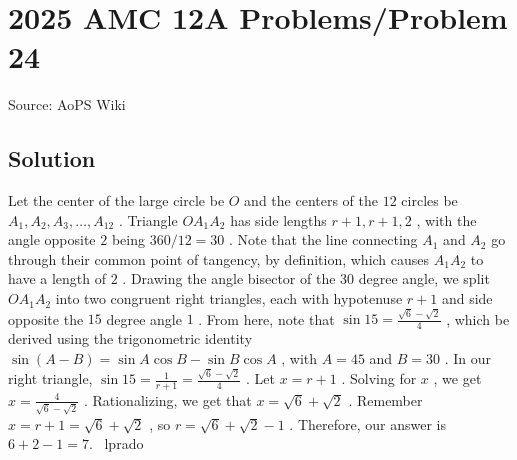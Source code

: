 \documentclass[12pt]{article}
\begin{document}
\section*{{2025 AMC 12A Problems/Problem 24}}
Source: AoPS Wiki

\subsection*{Solution}
Let the center of the large circle be $O$ and the centers of the $12$ circles be $A_1, A_2, A_3, \dots, A_{12}$ . Triangle $OA_1A_2$ has side lengths $r+1, r+1, 2$ , with the angle opposite $2$ being $360/12 = 30$ . Note that the line connecting $A_1$ and $A_2$ go through their common point of tangency, by definition, which causes $A_1A_2$ to have a length of $2$ . Drawing the angle bisector of the $30$ degree angle, we split $OA_1A_2$ into two congruent right triangles, each with hypotenuse $r+1$ and side opposite the $15$ degree angle $1$ . From here, note that $\sin{15} = \frac{\sqrt{6}-\sqrt{2}}{4}$ , which be derived using the trigonometric identity $\sin{(A-B)} = \sin{A} \cos{B} - \sin{B} \cos{A}$ , with $A=45$ and $B=30$ . In our right triangle, $\sin{15} = \frac{1}{r+1} = \frac{\sqrt{6}-\sqrt{2}}{4}$ . Let $x=r+1$ . Solving for $x$ , we get $x = \frac{4}{\sqrt{6}-\sqrt{2}}$ . Rationalizing, we get that $x = \sqrt{6}+\sqrt{2}$ . Remember $x = r+1 = \sqrt{6}+\sqrt{2}$ , so $r = \sqrt{6}+\sqrt{2} - 1$ . Therefore, our answer is $6+2-1 = \boxed{7}.$ ~lprado
\end{document}
